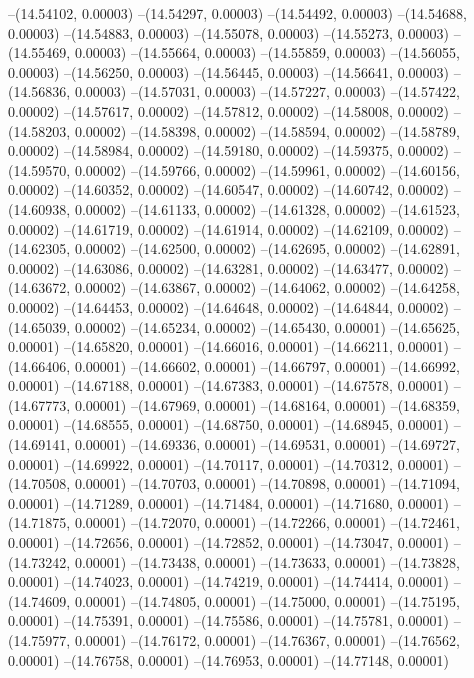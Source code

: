 --(14.54102, 0.00003)
--(14.54297, 0.00003)
--(14.54492, 0.00003)
--(14.54688, 0.00003)
--(14.54883, 0.00003)
--(14.55078, 0.00003)
--(14.55273, 0.00003)
--(14.55469, 0.00003)
--(14.55664, 0.00003)
--(14.55859, 0.00003)
--(14.56055, 0.00003)
--(14.56250, 0.00003)
--(14.56445, 0.00003)
--(14.56641, 0.00003)
--(14.56836, 0.00003)
--(14.57031, 0.00003)
--(14.57227, 0.00003)
--(14.57422, 0.00002)
--(14.57617, 0.00002)
--(14.57812, 0.00002)
--(14.58008, 0.00002)
--(14.58203, 0.00002)
--(14.58398, 0.00002)
--(14.58594, 0.00002)
--(14.58789, 0.00002)
--(14.58984, 0.00002)
--(14.59180, 0.00002)
--(14.59375, 0.00002)
--(14.59570, 0.00002)
--(14.59766, 0.00002)
--(14.59961, 0.00002)
--(14.60156, 0.00002)
--(14.60352, 0.00002)
--(14.60547, 0.00002)
--(14.60742, 0.00002)
--(14.60938, 0.00002)
--(14.61133, 0.00002)
--(14.61328, 0.00002)
--(14.61523, 0.00002)
--(14.61719, 0.00002)
--(14.61914, 0.00002)
--(14.62109, 0.00002)
--(14.62305, 0.00002)
--(14.62500, 0.00002)
--(14.62695, 0.00002)
--(14.62891, 0.00002)
--(14.63086, 0.00002)
--(14.63281, 0.00002)
--(14.63477, 0.00002)
--(14.63672, 0.00002)
--(14.63867, 0.00002)
--(14.64062, 0.00002)
--(14.64258, 0.00002)
--(14.64453, 0.00002)
--(14.64648, 0.00002)
--(14.64844, 0.00002)
--(14.65039, 0.00002)
--(14.65234, 0.00002)
--(14.65430, 0.00001)
--(14.65625, 0.00001)
--(14.65820, 0.00001)
--(14.66016, 0.00001)
--(14.66211, 0.00001)
--(14.66406, 0.00001)
--(14.66602, 0.00001)
--(14.66797, 0.00001)
--(14.66992, 0.00001)
--(14.67188, 0.00001)
--(14.67383, 0.00001)
--(14.67578, 0.00001)
--(14.67773, 0.00001)
--(14.67969, 0.00001)
--(14.68164, 0.00001)
--(14.68359, 0.00001)
--(14.68555, 0.00001)
--(14.68750, 0.00001)
--(14.68945, 0.00001)
--(14.69141, 0.00001)
--(14.69336, 0.00001)
--(14.69531, 0.00001)
--(14.69727, 0.00001)
--(14.69922, 0.00001)
--(14.70117, 0.00001)
--(14.70312, 0.00001)
--(14.70508, 0.00001)
--(14.70703, 0.00001)
--(14.70898, 0.00001)
--(14.71094, 0.00001)
--(14.71289, 0.00001)
--(14.71484, 0.00001)
--(14.71680, 0.00001)
--(14.71875, 0.00001)
--(14.72070, 0.00001)
--(14.72266, 0.00001)
--(14.72461, 0.00001)
--(14.72656, 0.00001)
--(14.72852, 0.00001)
--(14.73047, 0.00001)
--(14.73242, 0.00001)
--(14.73438, 0.00001)
--(14.73633, 0.00001)
--(14.73828, 0.00001)
--(14.74023, 0.00001)
--(14.74219, 0.00001)
--(14.74414, 0.00001)
--(14.74609, 0.00001)
--(14.74805, 0.00001)
--(14.75000, 0.00001)
--(14.75195, 0.00001)
--(14.75391, 0.00001)
--(14.75586, 0.00001)
--(14.75781, 0.00001)
--(14.75977, 0.00001)
--(14.76172, 0.00001)
--(14.76367, 0.00001)
--(14.76562, 0.00001)
--(14.76758, 0.00001)
--(14.76953, 0.00001)
--(14.77148, 0.00001)
